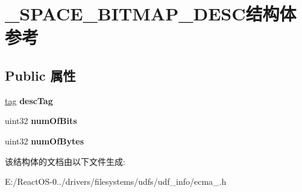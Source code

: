 \hypertarget{struct___s_p_a_c_e___b_i_t_m_a_p___d_e_s_c}{}\section{\+\_\+\+S\+P\+A\+C\+E\+\_\+\+B\+I\+T\+M\+A\+P\+\_\+\+D\+E\+S\+C结构体 参考}
\label{struct___s_p_a_c_e___b_i_t_m_a_p___d_e_s_c}
\subsection*{Public 属性}
\begin{DoxyCompactItemize}
\item 
\mbox{\label{struct___s_p_a_c_e___b_i_t_m_a_p___d_e_s_c_a460745963405e985e329aac10cfd81f4}} 
\hyperlink{structtag}{tag} {\bfseries desc\+Tag}
\item 
\mbox{\label{struct___s_p_a_c_e___b_i_t_m_a_p___d_e_s_c_a8bcd9ccbdeeec807f417e1e234f09486}} 
uint32 {\bfseries num\+Of\+Bits}
\item 
\mbox{\label{struct___s_p_a_c_e___b_i_t_m_a_p___d_e_s_c_a1da7bc676b7e863987da99eb97f111ba}} 
uint32 {\bfseries num\+Of\+Bytes}
\end{DoxyCompactItemize}


该结构体的文档由以下文件生成\+:\begin{DoxyCompactItemize}
\item 
E\+:/\+React\+O\+S-\/0../drivers/filesystems/udfs/udf\+\_\+info/ecma\+\_.\+h\end{DoxyCompactItemize}
